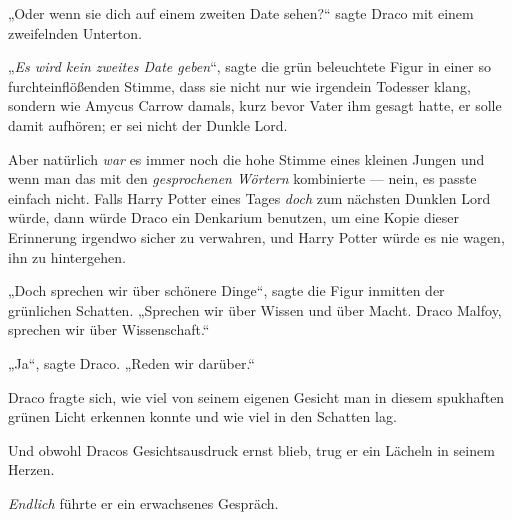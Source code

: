 „Oder wenn sie dich auf einem zweiten Date sehen?“ sagte Draco mit einem zweifelnden Unterton.

„\emph{Es wird kein zweites Date geben}“, sagte die grün beleuchtete Figur in einer so furchteinflößenden Stimme, dass sie nicht nur wie irgendein Todesser klang, sondern wie Amycus Carrow damals, kurz bevor Vater ihm gesagt hatte, er solle damit aufhören; er sei nicht der Dunkle Lord.

Aber natürlich \emph{war} es immer noch die hohe Stimme eines kleinen Jungen und wenn man das mit den \emph{gesprochenen Wörtern} kombinierte — nein, es passte einfach nicht. Falls Harry Potter eines Tages \emph{doch} zum nächsten Dunklen Lord würde, dann würde Draco ein Denkarium benutzen, um eine Kopie dieser Erinnerung irgendwo sicher zu verwahren, und Harry Potter würde es nie wagen, ihn zu hintergehen.

„Doch sprechen wir über schönere Dinge“, sagte die Figur inmitten der grünlichen Schatten.
„Sprechen wir über Wissen und über Macht. Draco Malfoy, sprechen wir über Wissenschaft.“

„Ja“, sagte Draco.
„Reden wir darüber.“

Draco fragte sich, wie viel von seinem eigenen Gesicht man in diesem spukhaften grünen Licht erkennen konnte und wie viel in den Schatten lag.

Und obwohl Dracos Gesichtsausdruck ernst blieb, trug er ein Lächeln in seinem Herzen.

\emph{Endlich} führte er ein erwachsenes Gespräch.

